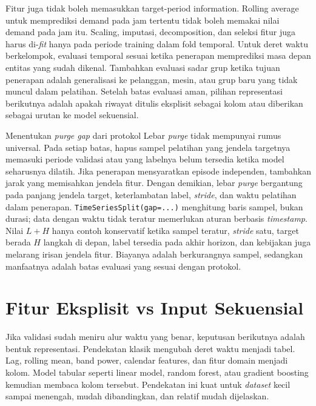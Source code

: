 Fitur juga tidak boleh memasukkan target-period information. Rolling average untuk memprediksi demand pada jam tertentu tidak boleh memakai nilai demand pada jam itu. Scaling, imputasi, decomposition, dan seleksi fitur juga harus di-\emph{fit} hanya pada periode training dalam fold temporal. Untuk deret waktu berkelompok, evaluasi temporal sesuai ketika penerapan memprediksi masa depan entitas yang sudah dikenal. Tambahkan evaluasi sadar grup ketika tujuan penerapan adalah generalisasi ke pelanggan, mesin, atau grup baru yang tidak muncul dalam pelatihan. Setelah batas evaluasi aman, pilihan representasi berikutnya adalah apakah riwayat ditulis eksplisit sebagai kolom atau diberikan sebagai urutan ke model sekuensial.

\begin{pendalaman}{Menentukan \emph{purge gap} dari protokol}
Lebar \emph{purge} tidak mempunyai rumus universal. Pada setiap batas, hapus sampel pelatihan yang jendela targetnya memasuki periode validasi atau yang labelnya belum tersedia ketika model seharusnya dilatih. Jika penerapan mensyaratkan episode independen, tambahkan jarak yang memisahkan jendela fitur. Dengan demikian, lebar \emph{purge} bergantung pada panjang jendela target, keterlambatan label, \emph{stride}, dan waktu pelatihan dalam penerapan. \passthrough{\lstinline!TimeSeriesSplit(gap=...)!} menghitung baris sampel, bukan durasi; data dengan waktu tidak teratur memerlukan aturan berbasis \emph{timestamp}. Nilai \(L+H\) hanya contoh konservatif ketika sampel teratur, \emph{stride} satu, target berada \(H\) langkah di depan, label tersedia pada akhir horizon, dan kebijakan juga melarang irisan jendela fitur. Biayanya adalah berkurangnya sampel, sedangkan manfaatnya adalah batas evaluasi yang sesuai dengan protokol.
\end{pendalaman}

\section{Fitur Eksplisit vs Input Sekuensial}\label{fitur-eksplisit-vs-input-sekuensial}

Jika validasi sudah meniru alur waktu yang benar, keputusan berikutnya adalah bentuk representasi. Pendekatan klasik mengubah deret waktu menjadi tabel. Lag, rolling mean, band power, calendar features, dan fitur domain menjadi kolom. Model tabular seperti linear model, random forest, atau gradient boosting kemudian membaca kolom tersebut. Pendekatan ini kuat untuk \emph{dataset} kecil sampai menengah, mudah dibandingkan, dan relatif mudah dijelaskan.

